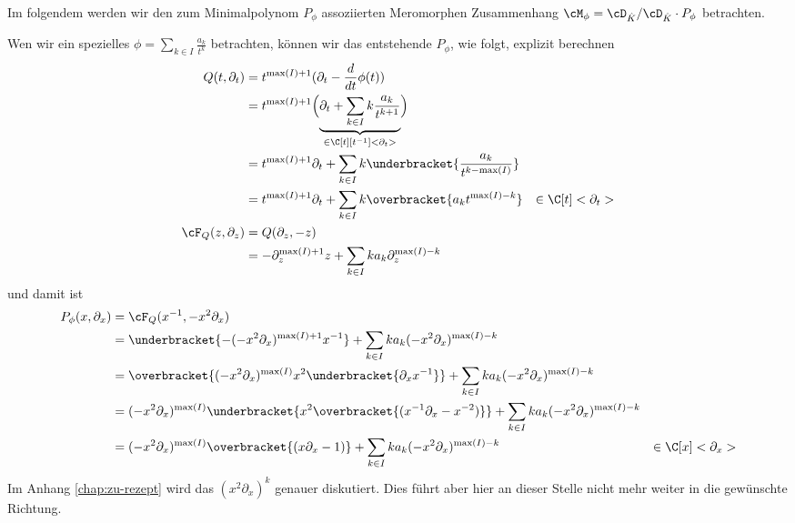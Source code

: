 Im folgendem werden wir den zum Minimalpolynom $P_\phi$ assoziierten
Meromorphen Zusammenhang $\cM_\phi=\cD_{\hat K}/\cD_{\hat K}\cdot P_{\phi}$
betrachten.

Wen wir ein spezielles $\phi=\sum_{k\in I}\frac{a_k}{t^{k}}$ betrachten, können
wir das entstehende $P_\phi$, wie folgt, explizit berechnen
\begin{align*}
Q(t,\partial_t) &= t^{\max(I)+1}(\partial_t-\frac{d}{dt}\phi(t))
\\&=t^{\max(I)+1}\Big(\underset{\in \C[t][t^{-1}]<\partial_t>}{\underbrace{
    \partial_t+\sum_{k\in I} k\frac{a_k}{t^{k+1}}}}\Big)
\\&=t^{\max(I)+1}\partial_t
  + \sum_{k\in I} k\underbracket{\frac{a_k}{t^{k-\max(I)}}}
\\&=t^{\max(I)+1}\partial_t +\sum_{k\in I}k \overbracket{a_k t^{\max(I)-k}}
  & \in \C[t]<\partial_t>
\\\cF_Q(z,\partial_z) &=Q(\partial_z,-z)
\\&=-\partial_z^{\max(I)+1}z +\sum_{k\in I}k a_k\partial_z^{\max(I)-k}
\end{align*}
und damit ist
\begin{align*}
P_{\phi}(x,\partial_x) &=\cF_Q(x^{-1},-x^2\partial_x)
\\&=\underbracket{-(-x^2\partial_x)^{\max(I)+1}x^{-1}}
  +\sum_{k\in I}k a_k(-x^2\partial_x)^{\max(I)-k}
\\&=\overbracket{(-x^2\partial_x)^{\max(I)} x^2\underbracket{\partial_xx^{-1}}}
   +\sum_{k\in I}k a_k(-x^2\partial_x)^{\max(I)-k}
\\&=(-x^2\partial_x)^{\max(I)}
   \underbracket{ x^2 \overbracket{(x^{-1}\partial_x-x^{-2})} }
   +\sum_{k\in I}k a_k(-x^2\partial_x)^{\max(I)-k}
\\&=(-x^2\partial_x)^{\max(I)} \overbracket{(x\partial_x-1)}
   +\sum_{k\in I}k a_k(-x^2\partial_x)^{\max(I)-k}
  & \in \C[x]<\partial_x>
\end{align*}
Im Anhang \ref{chap:zu-rezept} wird das $(x^2\partial_x)^{k}$ genauer
diskutiert. Dies führt aber hier an dieser Stelle nicht mehr weiter in die
gewünschte Richtung.

